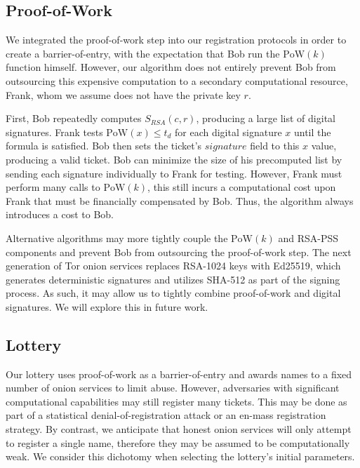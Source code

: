 \documentclass[USenglish,oneside,twocolumn]{article}
\begin{document}
\subsection{Proof-of-Work}
\label{sec:proofOfWork}


We integrated the proof-of-work step into our registration protocols in order to create a barrier-of-entry, with the expectation that Bob run the $ \mathrm{PoW}(k) $ function himself. However, our algorithm does not entirely prevent Bob from outsourcing this expensive computation to a secondary computational resource, Frank, whom we assume does not have the private key $ r $. 

First, Bob repeatedly computes $ S_{\mathit{RSA}}(c, r) $, producing a large list of digital signatures. Frank tests $ \mathrm{PoW}(x) \leq t_{d} $ for each digital signature $ x $ until the formula is satisfied. Bob then sets the ticket's $ \mathit{signature} $ field to this $ x $ value, producing a valid ticket. Bob can minimize the size of his precomputed list by sending each signature individually to Frank for testing. However, Frank must perform many calls to $ \mathrm{PoW}(k) $, this still incurs a computational cost upon Frank that must be financially compensated by Bob. Thus, the algorithm always introduces a cost to Bob.

Alternative algorithms may more tightly couple the $ \mathrm{PoW}(k) $ and RSA-PSS components and prevent Bob from outsourcing the proof-of-work step. The next generation of Tor onion services \cite{TorProp224} replaces RSA-1024 keys with Ed25519, which generates deterministic signatures and utilizes SHA-512 as part of the signing process. As such, it may allow us to tightly combine proof-of-work and digital signatures. We will explore this in future work.

\subsection{Lottery}
\label{sec:lottery}

Our lottery uses proof-of-work as a barrier-of-entry and awards names to a fixed number of onion services to limit abuse. However, adversaries with significant computational capabilities may still register many tickets. This may be done as part of a statistical denial-of-registration attack or an en-mass registration strategy. By contrast, we anticipate that honest onion services will only attempt to register a single name, therefore they may be assumed to be computationally weak. We consider this dichotomy when selecting the lottery's initial parameters.
\end{document}
